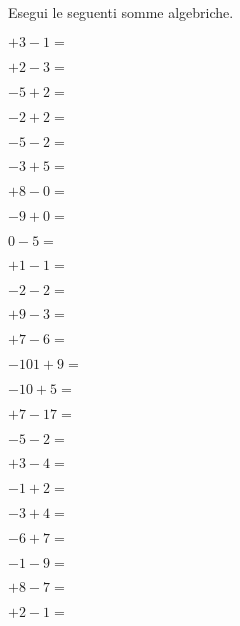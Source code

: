 \begin{esercizio}
Esegui le seguenti somme algebriche.
 \label{ese:2.14}
 \begin{multicols}{4}
 \begin{enumeratea}
 \item \(+3 -1 =\)
 \item \(+2 -3 =\)
 \item \(-5 +2 =\)
 \item \(-2 +2 =\)
 \item \(-5 -2 =\)
 \item \(-3 +5 =\)
 \item \(+8 -0 =\)
 \item \(-9 +0 =\)
 \item \(0 -5 =\)
 \item \(+1 -1 =\)
 \item \(-2 -2 =\)
 \item \(+9 -3 =\)
 \item \(+7 -6 =\)
 \item \(-101 +9 =\)
 \item \(-10 +5 =\)
 \item \(+7 -17 =\)
 \item \(-5 -2 =\)
 \item \(+3 -4 =\)
 \item \(-1 +2 =\)
 \item \(-3 +4 =\)
 \item \(-6 +7 =\)
 \item \(-1 -9 =\)
 \item \(+8 -7 =\)
 \item \(+2 -1 =\)
 \end{enumeratea}

\end{multicols}

\end{esercizio}

